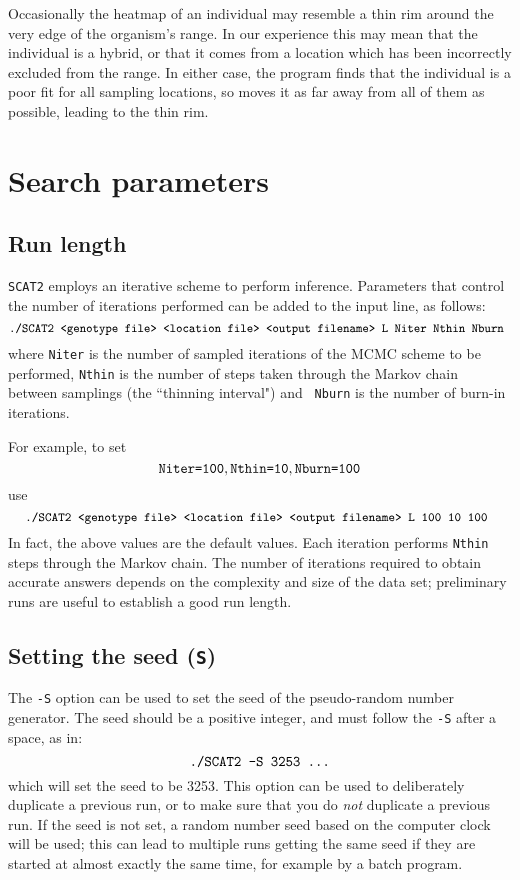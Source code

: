 \documentclass[10pt,titlepage,times,letterpaper]{article}
\def\SCAT{{\tt SCAT2} }
\begin{document}
Occasionally the heatmap of an individual may resemble a thin rim around the
very edge of the organism's range.  In our experience this may mean that
the individual is a hybrid, or that it comes from a location which has been
incorrectly excluded from the range.  In either case, the program finds that
the individual is a poor fit for all sampling locations, so moves it as far
away from all of them as possible, leading to the thin rim.

\section{Search parameters} \label{HowLong}

\subsection{Run length}
\SCAT employs an iterative scheme to perform inference. 
Parameters that control the number of iterations performed
can be added to the input line, as follows:
$$\text{{\small \tt ./SCAT2 <genotype file> <location file> <output
filename> L Niter Nthin Nburn }}$$ where {\tt Niter} is the number
of sampled iterations of the MCMC scheme to be performed, {\tt Nthin} is the
number of steps taken through the Markov chain between samplings (the ``thinning interval") and {\tt
Nburn} is the number of burn-in iterations.

For example, to set
$$\text{{\tt Niter=100}}, \text{{\tt Nthin=10}}, \text{{\tt Nburn=100}}$$
use
$$\text{{\tt \small./SCAT2 <genotype file> <location file> <output
filename> L 100 10 100 }}$$ 
In fact, the above values are the
default values. Each iteration performs {\tt Nthin}
steps through the Markov chain.
The number of iterations required to obtain accurate answers depends
on the complexity and size of the data set; preliminary runs are useful
to establish a good run length.

\subsection{Setting the seed ({\tt S})} \label{Soption}

The {\tt -S} option can be used to set the seed of the
pseudo-random number generator. The seed should be a
positive integer, and must follow the {\tt -S} after a space, as in:
$$\text{{\tt ./SCAT2 -S 3253 ...}}$$
which will set the seed to be 3253. This option can be
used to deliberately duplicate a previous run, or to make sure 
that you do {\it not}
duplicate a previous run.  If the seed is not set, a 
random number seed based on the computer clock will be used;
this can lead to multiple runs getting the same seed if they are started
at almost exactly the same time, for example by a batch program.
\end{document}
